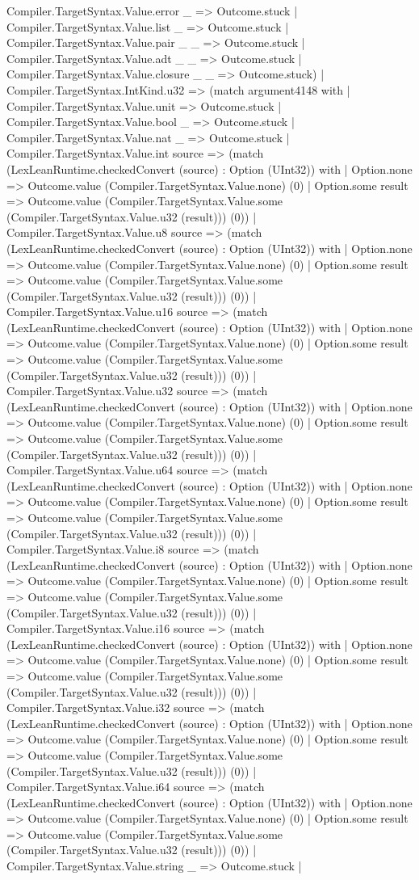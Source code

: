 \documentclass[11pt]{article}
\begin{document}
Compiler.TargetSyntax.Value.error \_ => Outcome.stuck | Compiler.TargetSyntax.Value.list \_ => Outcome.stuck | Compiler.TargetSyntax.Value.pair \_ \_ => Outcome.stuck | Compiler.TargetSyntax.Value.adt \_ \_ => Outcome.stuck | Compiler.TargetSyntax.Value.closure \_ \_ => Outcome.stuck) | Compiler.TargetSyntax.IntKind.u32 => (match argument4148 with | Compiler.TargetSyntax.Value.unit => Outcome.stuck | Compiler.TargetSyntax.Value.bool \_ => Outcome.stuck | Compiler.TargetSyntax.Value.nat \_ => Outcome.stuck | Compiler.TargetSyntax.Value.int source => (match (LexLeanRuntime.checkedConvert (source) : Option (UInt32)) with | Option.none => Outcome.value (Compiler.TargetSyntax.Value.none) (0) | Option.some result => Outcome.value (Compiler.TargetSyntax.Value.some (Compiler.TargetSyntax.Value.u32 (result))) (0)) | Compiler.TargetSyntax.Value.u8 source => (match (LexLeanRuntime.checkedConvert (source) : Option (UInt32)) with | Option.none => Outcome.value (Compiler.TargetSyntax.Value.none) (0) | Option.some result => Outcome.value (Compiler.TargetSyntax.Value.some (Compiler.TargetSyntax.Value.u32 (result))) (0)) | Compiler.TargetSyntax.Value.u16 source => (match (LexLeanRuntime.checkedConvert (source) : Option (UInt32)) with | Option.none => Outcome.value (Compiler.TargetSyntax.Value.none) (0) | Option.some result => Outcome.value (Compiler.TargetSyntax.Value.some (Compiler.TargetSyntax.Value.u32 (result))) (0)) | Compiler.TargetSyntax.Value.u32 source => (match (LexLeanRuntime.checkedConvert (source) : Option (UInt32)) with | Option.none => Outcome.value (Compiler.TargetSyntax.Value.none) (0) | Option.some result => Outcome.value (Compiler.TargetSyntax.Value.some (Compiler.TargetSyntax.Value.u32 (result))) (0)) | Compiler.TargetSyntax.Value.u64 source => (match (LexLeanRuntime.checkedConvert (source) : Option (UInt32)) with | Option.none => Outcome.value (Compiler.TargetSyntax.Value.none) (0) | Option.some result => Outcome.value (Compiler.TargetSyntax.Value.some (Compiler.TargetSyntax.Value.u32 (result))) (0)) | Compiler.TargetSyntax.Value.i8 source => (match (LexLeanRuntime.checkedConvert (source) : Option (UInt32)) with | Option.none => Outcome.value (Compiler.TargetSyntax.Value.none) (0) | Option.some result => Outcome.value (Compiler.TargetSyntax.Value.some (Compiler.TargetSyntax.Value.u32 (result))) (0)) | Compiler.TargetSyntax.Value.i16 source => (match (LexLeanRuntime.checkedConvert (source) : Option (UInt32)) with | Option.none => Outcome.value (Compiler.TargetSyntax.Value.none) (0) | Option.some result => Outcome.value (Compiler.TargetSyntax.Value.some (Compiler.TargetSyntax.Value.u32 (result))) (0)) | Compiler.TargetSyntax.Value.i32 source => (match (LexLeanRuntime.checkedConvert (source) : Option (UInt32)) with | Option.none => Outcome.value (Compiler.TargetSyntax.Value.none) (0) | Option.some result => Outcome.value (Compiler.TargetSyntax.Value.some (Compiler.TargetSyntax.Value.u32 (result))) (0)) | Compiler.TargetSyntax.Value.i64 source => (match (LexLeanRuntime.checkedConvert (source) : Option (UInt32)) with | Option.none => Outcome.value (Compiler.TargetSyntax.Value.none) (0) | Option.some result => Outcome.value (Compiler.TargetSyntax.Value.some (Compiler.TargetSyntax.Value.u32 (result))) (0)) | Compiler.TargetSyntax.Value.string \_ => Outcome.stuck | 
\end{document}
